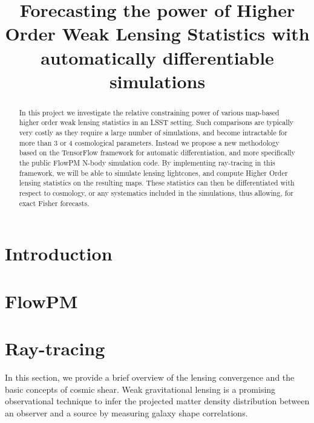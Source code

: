 \documentclass[twocolumn,twocolappendix]{aastex63}
\begin{document}
\title{Forecasting the power of Higher Order Weak Lensing Statistics with automatically differentiable simulations}


\begin{abstract}
In this project we investigate the relative constraining power of various map-based higher order weak lensing statistics in an LSST setting. Such comparisons are typically very costly as they require a large number of simulations, and become intractable for more than 3 or 4 cosmological parameters. Instead we propose a new methodology based on the TensorFlow framework for automatic differentiation, and more specifically the public FlowPM N-body simulation code. By implementing ray-tracing in this framework, we will be able to simulate lensing lightcones, and compute Higher Order lensing statistics on the resulting maps. These statistics can then be differentiated with respect to cosmology, or any systematics included in the simulations, thus allowing, for exact Fisher forecasts.
\end{abstract}





\section{Introduction}

\section{FlowPM}

\section{Ray-tracing}
In this section, we provide a brief overview of the lensing convergence and the basic concepts of cosmic shear.
Weak gravitational lensing is a promising observational technique to infer the projected matter density distribution between an observer and a source by measuring galaxy shape correlations. 
\end{document}

